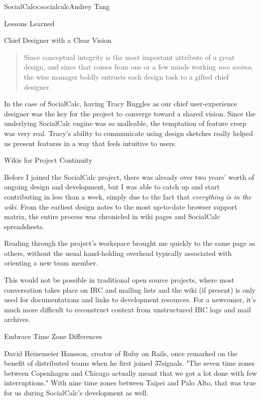 \begin{aosachapter}{SocialCalc}{s:socialcalc}{Audrey Tang}
\begin{aosasect1}{Lessons Learned}
\begin{aosasect2}{Chief Designer with a Clear Vision}
\begin{quotation}

  \noindent
  Since conceptual integrity is the most important attribute of a
  great design, and since that comes from one or a few minds working
  \emph{uno animo}, the wise manager boldly entrusts each design task to a
  gifted chief designer.

\end{quotation}

In the case of SocialCalc, having Tracy Ruggles as our chief
user-experience designer was the key for the project to converge
toward a shared vision.  Since the underlying SocialCalc engine was
so malleable, the temptation of feature creep was very real. Tracy's
ability to communicate using design sketches really helped us
present features in a way that feels intuitive to users.

\end{aosasect2}

\begin{aosasect2}{Wikis for Project Continuity}

Before I joined the SocialCalc project, there was already over two
years' worth of ongoing design and development, but I was able to
catch up and start contributing in less than a week, simply due to
the fact that \emph{everything is in the wiki}. From the earliest
design notes to the most up-to-date browser support matrix, the
entire process was chronicled in wiki pages and SocialCalc
spreadsheets.

Reading through the project's workspace brought me quickly to the same
page as others, without the usual hand-holding overhead
typically associated with orienting a new team member.

This would not be possible in traditional open source projects, where
most conversation takes place on IRC and mailing lists and the wiki
(if present) is only used for documentations and links to development
resources.  For a newcomer, it's much more difficult to reconstruct
context from unstructured IRC logs and mail archives.

\end{aosasect2}

\begin{aosasect2}{Embrace Time Zone Differences}

David Heinemeier Hansson, creator of Ruby on Rails, once remarked on
the benefit of distributed teams when he first joined 37signals. "The
seven time zones between Copenhagen and Chicago actually meant that
we got a lot done with few interruptions." With nine time zones
between Taipei and Palo Alto, that was true for us during
SocialCalc's development as well.


\end{aosasect2}
\end{aosasect1}
\end{aosachapter}
